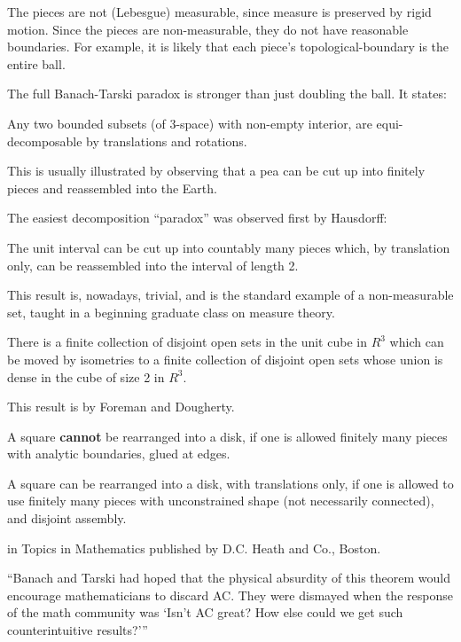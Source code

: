 


The pieces are not (Lebesgue) measurable, since measure is preserved by
rigid motion. Since the pieces are non-measurable, they do not have
reasonable boundaries. For example, it is likely that each piece's
topological-boundary is the entire ball.

The full Banach-Tarski paradox is stronger than just doubling the ball.
It states:

Any two bounded subsets (of $3$-space) with non-empty interior, are
equi-decomposable by translations and rotations.

This is usually illustrated by observing that a pea can be cut up into
finitely pieces and reassembled into the Earth.

The easiest decomposition ``paradox'' was observed first by Hausdorff:

The unit interval can be cut up into countably many pieces which, by
translation only, can be reassembled into the interval of length 2.

This result is, nowadays, trivial, and is the standard example of a
non-measurable set, taught in a beginning graduate class on measure
theory.

\begin{teo}
  There is a finite collection of disjoint open sets in the unit cube in
  $R^3$ which can be moved by isometries to a finite collection of
  disjoint open sets whose union is dense in the cube of size 2 in
  $R^3$.
\end{teo}
This result is by Foreman and Dougherty.


A square {\bf cannot} be rearranged into a disk, if one is allowed
finitely many pieces with analytic boundaries, glued at edges.

A square can be rearranged into a disk, with translations only, if one
is allowed to use finitely many pieces with unconstrained shape (not
necessarily connected), and disjoint assembly.

\Ref

  {in
  Topics in Mathematics published by D.C. Heath and Co., Boston.}{}


``Banach and Tarski had hoped that the physical absurdity of this
theorem would encourage mathematicians to discard AC. They were dismayed
when the response of the math community was `Isn't AC great?  How else
could we get such counterintuitive results?'{}''
